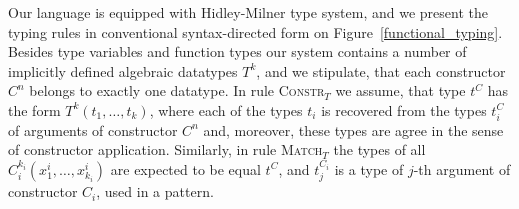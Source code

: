 
Our language is equipped with Hidley-Milner type system, and we present the typing rules in conventional syntax-directed form 
on Figure~\ref{functional_typing}. Besides type variables and function types our system contains a number of implicitly defined 
algebraic datatypes $T^k$, and we stipulate, that each constructor $C^n$ belongs to exactly one
datatype. In rule \textsc{Constr$_T$} we assume, that type $t^C$ has the form $T^k(t_1,\dots,t_k)$, where each of the types
$t_i$ is recovered from the types $t_i^C$ of arguments of constructor $C^n$ and, moreover, these types are agree in the sense of
constructor application. Similarly, in rule \textsc{Match$_T$} the types of all $C_i^{k_i}(x^i_1,\dots,x^i_{k_i})$ are expected
to be equal $t^C$, and $t^{C_i}_j$ is a type of $j$-th argument of constructor $C_i$, used in a pattern.

\setarrow{:}
\newcommand{\typed}[3]{\withenv{#1}{\trans{#2}{}{#3}}}

